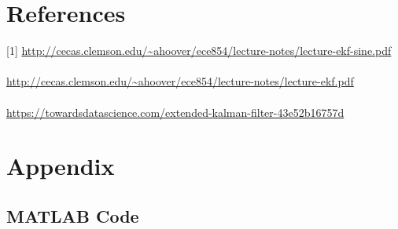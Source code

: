 \documentclass[12pt]{article}
\begin{document}
\section*{References}
[1] \url{http://cecas.clemson.edu/~ahoover/ece854/lecture-notes/lecture-ekf-sine.pdf} \\
\quad \\
\noindent 
[2] \url{http://cecas.clemson.edu/~ahoover/ece854/lecture-notes/lecture-ekf.pdf} \\
\quad \\
\noindent
[3] \url{https://towardsdatascience.com/extended-kalman-filter-43e52b16757d}

\newpage
\section*{Appendix}

\subsection*{MATLAB Code}

\end{document}
